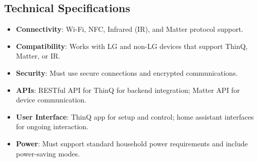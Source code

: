 \documentclass[conference]{IEEEtran}
\begin{document}
\subsection{\large{Technical Specifications}}
\begin{itemize}
\item \textbf{Connectivity}: Wi-Fi, NFC, Infrared (IR), and Matter protocol support.\\
\item \textbf{Compatibility}: Works with LG and non-LG devices that support ThinQ, Matter, or IR.\\
\item \textbf{Security}: Must use secure connections and encrypted communications.\\
\item \textbf{APIs}: RESTful API for ThinQ for backend integration; Matter API for device communication.\\
\item \textbf{User Interface}: ThinQ app for setup and control; home assistant interfaces for ongoing interaction.\\
\item \textbf{Power}: Must support standard household power requirements and include power-saving modes.\\
\end{itemize}
\end{document}
